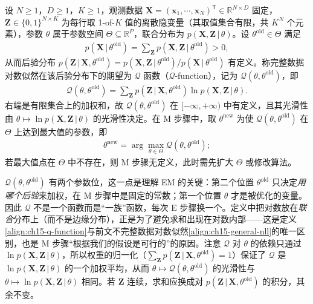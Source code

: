 \documentclass[../../main.tex]{subfiles}
\begin{document}
\begin{definition}\label{definition:ch15-Q函数}
设 $N\geqslant1$，$D\geqslant1$，$K\geqslant1$，观测数据 $\bm{X}=(\bm{x}_1,\cdots,\bm{x}_N)^{\mathsf T}\in\mathbb{R}^{N\times D}$ 固定，$\bm{Z}\in\{0,1\}^{N\times K}$ 为每行取 1-of-$K$ 值的离散隐变量（其取值集合有限，共 $K^{N}$ 个元素），参数 $\theta$ 属于参数空间 $\Theta\subseteq\mathbb{R}^{P}$，联合分布为 $p(\bm{X},\bm{Z}\,|\,\theta)$。设 $\theta^{\text{old}}\in\Theta$ 满足
\begin{align*}
p(\bm{X}\,|\,\theta^{\text{old}})=\sum_{\bm{Z}}p(\bm{X},\bm{Z}\,|\,\theta^{\text{old}})>0,
\end{align*}
从而后验分布 $p(\bm{Z}\,|\,\bm{X},\theta^{\text{old}})=p(\bm{X},\bm{Z}\,|\,\theta^{\text{old}})/p(\bm{X}\,|\,\theta^{\text{old}})$ 有定义。称完整数据对数似然在该后验分布下的期望为 $\mathcal{Q}$ 函数（$\mathcal{Q}$-function），记为 $\mathcal{Q}(\theta,\theta^{\text{old}})$，即
\begin{align}
\mathcal{Q}(\theta,\theta^{\text{old}})=\sum_{\bm{Z}}p(\bm{Z}\,|\,\bm{X},\theta^{\text{old}})\ln p(\bm{X},\bm{Z}\,|\,\theta).
\label{align:ch15-q-function}
\end{align}
右端是有限集合上的加权和，故 $\mathcal{Q}(\theta,\theta^{\text{old}})$ 在 $[-\infty,+\infty)$ 中有定义，且其光滑性由 $\theta\mapsto\ln p(\bm{X},\bm{Z}\,|\,\theta)$ 的光滑性决定。在 M 步骤中，取 $\theta^{\text{new}}$ 为使 $\mathcal{Q}(\theta,\theta^{\text{old}})$ 在 $\Theta$ 上达到最大值的参数，即
\begin{align}
\theta^{\text{new}}=\arg\max_{\theta\in\Theta}\mathcal{Q}(\theta,\theta^{\text{old}});
\label{align:ch15-m-step}
\end{align}
若最大值点在 $\Theta$ 中不存在，则 M 步骤无定义，此时需先扩大 $\Theta$ 或修改算法。
\end{definition}

\begin{remark}
$\mathcal{Q}(\theta,\theta^{\text{old}})$ 有两个参数位，这一点是理解 EM 的关键：第二个位置 $\theta^{\text{old}}$ 只决定\emph{用哪个后验}来加权，在 M 步骤中是固定的常数；第一个位置 $\theta$ 才是被优化的变量。因此 $\mathcal{Q}$ 不是一个函数而是“一族”函数，每次 E 步骤换一个。定义中把对数放在\emph{联合}分布上（而不是边缘分布），正是为了避免求和出现在对数内部——这是定义\eqref{align:ch15-q-function}与前文不完整数据对数似然\eqref{align:ch15-general-nll}的唯一区别，也是 M 步骤“根据我们的假设是可行的”的原因。注意 $\mathcal{Q}$ 对 $\theta$ 的依赖只通过 $\ln p(\bm{X},\bm{Z}\,|\,\theta)$，所以权重的归一化（$\sum_{\bm{Z}}p(\bm{Z}\,|\,\bm{X},\theta^{\text{old}})=1$）保证了 $\mathcal{Q}$ 是 $\ln p(\bm{X},\bm{Z}\,|\,\theta)$ 的一个加权平均，从而 $\theta\mapsto\mathcal{Q}(\theta,\theta^{\text{old}})$ 的光滑性与 $\theta\mapsto\ln p(\bm{X},\bm{Z}\,|\,\theta)$ 相同。若 $\bm{Z}$ 连续，求和应换成对 $p(\bm{Z}\,|\,\bm{X},\theta^{\text{old}})$ 的积分，其余不变。
\end{remark}
\end{document}
